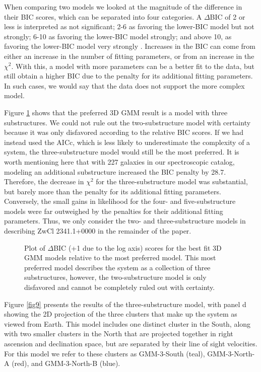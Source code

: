 \documentclass[onecolumn]{aastex}
\begin{document}
When comparing two models we looked at the magnitude of the difference in their BIC scores, which can be separated into four categories.  A $\Delta$BIC of 2 or less is interpreted as not significant; 2-6 as favoring the lower-BIC model but not strongly; 6-10 as favoring the lower-BIC model strongly; and above 10, as favoring the lower-BIC model very strongly \citep{Liddle04}.  Increases in the BIC can come from either an increase in the number of fitting parameters, or from an increase in the $\chi^2$.  With this, a model with more parameters can be a better fit to the data, but still obtain a higher BIC due to the penalty for its additional fitting parameters.  In such cases, we would say that the data does not support the more complex model.

Figure \ref{fig8} shows that the preferred 3D GMM result is a model with three substructures.  We could not rule out the two-substructure model with certainty because it was only disfavored according to the relative BIC scores.  If we had instead used the AICc, which is less likely to underestimate the complexity of a system, the three-substructure model would still be the most preferred.  It is worth mentioning here that with 227 galaxies in our spectroscopic catalog, modeling an additional substructure increased the BIC penalty by 28.7.  Therefore, the decrease in $\chi^2$ for the three-substructure model was substantial, but barely more than the penalty for its additional fitting parameters.  Conversely, the small gains in likelihood for the four- and five-substructure models were far outweighed by the penalties for their additional fitting parameters.  Thus, we only consider the two- and three-substructure models in describing ZwCl 2341.1+0000 in the remainder of the paper.

\begin{figure}  
\caption{Plot of $\Delta$BIC (+1 due to the log axis) scores for the best fit 3D GMM models relative to the most preferred model.  This most preferred model describes the system as a collection of three substructures, however, the two-substructure model is only disfavored and cannot be completely ruled out with certainty.\label{fig8}} 
\end{figure} 

Figure \ref{fig9} presents the results of the three-substructure model, with panel d showing the 2D projection of the three clusters that make up the system as viewed from Earth.  This model includes one distinct cluster in the South, along with two smaller clusters in the North that are projected together in right ascension and declination space, but are separated by their line of sight velocities.  For this model we refer to these clusters as GMM-3-South (teal), GMM-3-North-A (red), and GMM-3-North-B (blue).
\end{document}
